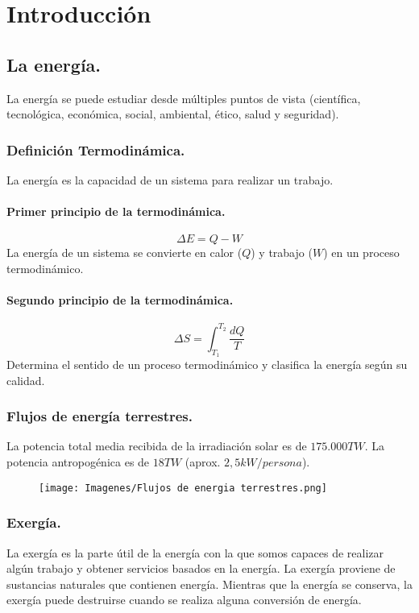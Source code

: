 \chapter{Introducción}
\section{La energía.}
La energía se puede estudiar desde múltiples puntos de vista (científica, tecnológica, económica, social, ambiental, ético, salud y seguridad).

\subsection{Definición Termodinámica.}
La energía es la capacidad de un sistema para realizar un trabajo.

\subsubsection{Primer principio de la termodinámica.}
\begin{equation}
    \Delta E = Q - W
\end{equation}
La energía de un sistema se convierte en calor ($Q$) y trabajo ($W$) en un proceso termodinámico.

\subsubsection{Segundo principio de la termodinámica.}
\begin{equation}
    \Delta S = \int_{T_1}^{T_2}{\frac{dQ}{T}}
\end{equation}
Determina el sentido de un proceso termodinámico y clasifica la energía según su calidad.

\subsection{Flujos de energía terrestres.}
La potencia total media recibida de la irradiación solar es de $175.000 TW$. La potencia antropogénica es de $18 TW$ (aprox. $2,5 kW/persona$).

\begin{figure}[h]
    \centering
    \texttt{[image: Imagenes/Flujos de energia terrestres.png]}
\end{figure}

\subsection{Exergía.}
La exergía es la parte útil de la energía con la que somos capaces de realizar algún trabajo y obtener servicios basados en la energía. La exergía proviene de sustancias naturales que contienen energía. Mientras que la energía se conserva, la exergía puede destruirse cuando se realiza alguna conversión de energía.

